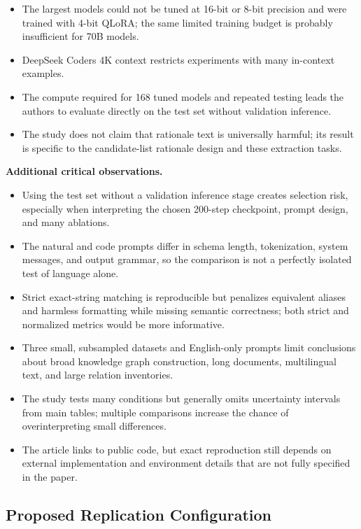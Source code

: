 \documentclass[11pt]{article}
\begin{document}
\begin{itemize}
\item
  The largest models could not be tuned at 16-bit or 8-bit precision and
  were trained with 4-bit QLoRA; the same limited training budget is
  probably insufficient for 70B models.
\item
  DeepSeek Coder\textquotesingle s 4K context restricts experiments with
  many in-context examples.
\item
  The compute required for 168 tuned models and repeated testing leads
  the authors to evaluate directly on the test set without validation
  inference.
\item
  The study does not claim that rationale text is universally harmful;
  its result is specific to the candidate-list rationale design and
  these extraction tasks.
\end{itemize}

\textbf{Additional critical observations.}

\begin{itemize}
\item
  Using the test set without a validation inference stage creates
  selection risk, especially when interpreting the chosen 200-step
  checkpoint, prompt design, and many ablations.
\item
  The natural and code prompts differ in schema length, tokenization,
  system messages, and output grammar, so the comparison is not a
  perfectly isolated test of \textquotesingle language\textquotesingle{}
  alone.
\item
  Strict exact-string matching is reproducible but penalizes equivalent
  aliases and harmless formatting while missing semantic correctness;
  both strict and normalized metrics would be more informative.
\item
  Three small, subsampled datasets and English-only prompts limit
  conclusions about broad knowledge graph construction, long documents,
  multilingual text, and large relation inventories.
\item
  The study tests many conditions but generally omits uncertainty
  intervals from main tables; multiple comparisons increase the chance
  of overinterpreting small differences.
\item
  The article links to public code, but exact reproduction still depends
  on external implementation and environment details that are not fully
  specified in the paper.
\end{itemize}

\subsection{Proposed Replication Configuration}
\label{proposed-replication-configuration}
\end{document}

